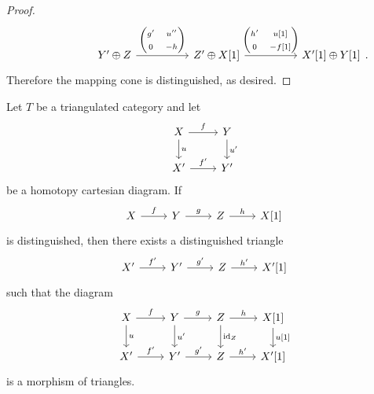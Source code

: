 \documentclass[dissertation.tex]{subfiles}
\begin{document}
\begin{prop}
\begin{proof}
$$\begin{tikzcd}[ampersand replacement=\&]
    \&\& Y^\prime \oplus Z \arrow{rr}{\left(\begin{matrix}g^\prime & u^{\prime\prime}\\0 & -h\end{matrix}\right)}
    \&\& Z^\prime \oplus X[1] \arrow{rr}{\left(\begin{matrix}h^\prime & u[1]\\0 & -f[1]\end{matrix}\right)}
    \&\& X^\prime[1] \oplus Y[1]
  \end{tikzcd}.$$
  Therefore the mapping cone is distinguished, as desired.
\end{proof}
\end{prop}

\begin{cor}\label{homotopycokernels}
  Let $T$ be a triangulated category and let
  $$\begin{tikzcd}
    X \arrow{r}{f}\arrow{d}{u} & Y\arrow{d}{u^\prime}\\
    X^\prime \arrow{r}{f^\prime} & Y^\prime
  \end{tikzcd}$$
  be a homotopy cartesian diagram.
  If
  $$\begin{tikzcd}
    X \arrow{r}{f} & Y \arrow{r}{g} & Z \arrow{r}{h} & X[1]
  \end{tikzcd}$$
  is distinguished, then there exists a distinguished triangle
  $$\begin{tikzcd}
    X^\prime \arrow{r}{f^\prime} & Y^\prime \arrow{r}{g^\prime} & Z \arrow{r}{h^\prime} & X^\prime[1]
  \end{tikzcd}$$
  such that the diagram
  $$\begin{tikzcd}
    X \arrow{r}{f}\arrow{d}{u} & Y \arrow{r}{g}\arrow{d}{u^\prime} & Z \arrow{r}{h}\arrow{d}{\id_Z} & X[1]\arrow{d}{u[1]}\\
    X^\prime \arrow{r}{f^\prime} & Y^\prime \arrow{r}{g^\prime} & Z \arrow{r}{h^\prime} & X^\prime[1]
  \end{tikzcd}$$
  is a morphism of triangles.
  

\end{cor}
\end{document}
